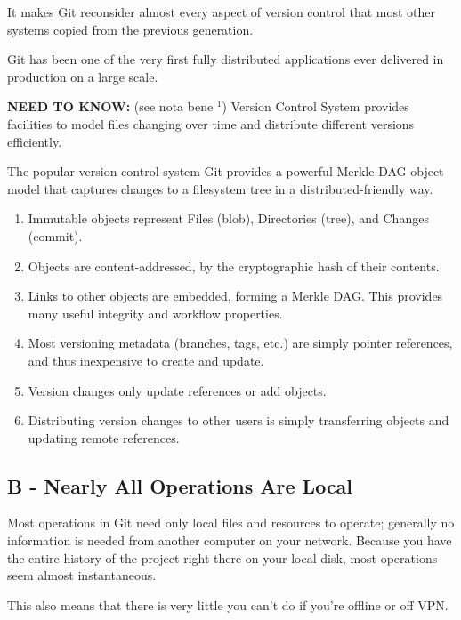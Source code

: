 \documentclass{tufte-handout}
\begin{document}
	It makes Git reconsider almost every aspect of version control that most other systems copied from the previous generation.
	
	Git has been one of the very first fully distributed applications ever delivered in production on a large scale.
	
	\textbf{NEED TO KNOW:} (see nota bene ${}^{1}$) Version Control System provides facilities to model files changing over time and distribute different versions efficiently.
	
	The popular version control system Git provides a powerful Merkle DAG object model that captures changes to a filesystem tree in a distributed-friendly way.
	
	\begin{enumerate}
		\item Immutable objects represent Files (blob), Directories (tree), and Changes (commit).
		\item Objects are content-addressed, by the cryptographic hash of their contents.
		\item Links to other objects are embedded, forming a Merkle DAG. This provides many useful integrity and workflow properties.
		\item Most versioning metadata (branches, tags, etc.) are simply pointer references, and thus inexpensive to create and update.
		\item Version changes only update references or add objects.
		\item Distributing version changes to other users is simply transferring objects and updating remote references.
	\end{enumerate}
	
	
	\clearpage
	
	\subsection{B - Nearly All Operations Are Local}
	
	Most operations in Git need only local files and resources to operate; generally no information is needed from another computer on your network. Because you have the entire history of the project right there on your local disk, most operations seem almost instantaneous.
	
	This also means that there is very little you can't do if you're offline or off VPN.
	
\end{document}
